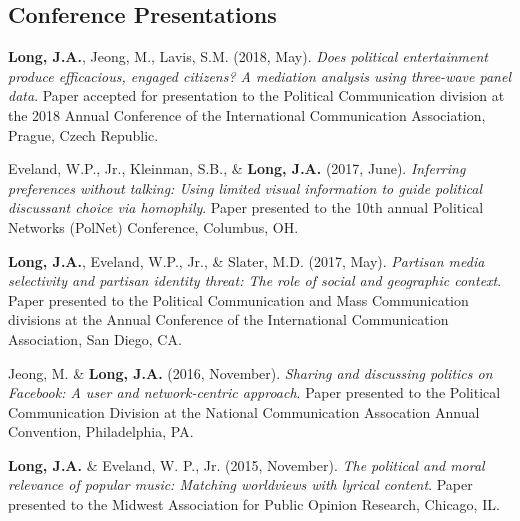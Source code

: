 \documentclass[margin,line]{res}
\begin{document}
\begin{resume}

\section{\sc Conference Presentations}

{\bf Long, J.A.}, Jeong, M., Lavis, S.M. (2018, May). \emph{Does political entertainment produce efficacious, engaged citizens? A mediation analysis using three-wave panel data}. Paper accepted for presentation to the Political Communication division at the 2018 Annual Conference of the International Communication Association, Prague, Czech Republic.

Eveland, W.P., Jr., Kleinman, S.B., \& \textbf{Long, J.A.} (2017, June). \emph{Inferring preferences without talking: Using limited visual information to guide political discussant choice via homophily}. Paper presented to the 10th annual Political Networks (PolNet) Conference, Columbus, OH.

{\bf Long, J.A.}, Eveland, W.P., Jr., \& Slater, M.D. (2017, May). \emph{Partisan media selectivity and partisan identity threat: The role of social and geographic context}. Paper presented to the Political Communication and Mass Communication divisions at the Annual Conference of the International Communication Association, San Diego, CA.

Jeong, M. \&  {\bf Long, J.A.} (2016, November). \emph{Sharing and discussing politics on Facebook: A user and network-centric approach}. Paper presented to the Political Communication Division at the National Communication Assocation Annual Convention, Philadelphia, PA.

{\bf Long, J.A.} \& Eveland, W. P., Jr. (2015, November). \emph{The political and moral relevance of popular music: Matching worldviews with lyrical content}. Paper presented to the Midwest Association for Public Opinion Research, Chicago, IL.



\end{resume}
\end{document}
